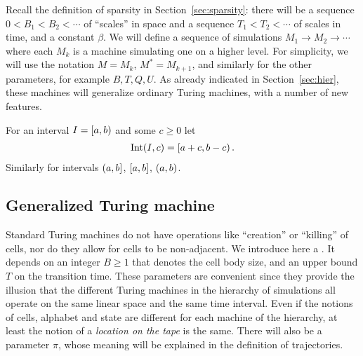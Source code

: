 \documentclass[11pt]{memoir}
\theoremstyle{definition} %
\renewcommand{\ge}{\geq}
\def\B{B}
\def\U{U}
\newcommand{\Int}{\mathrm{Int}}
\newcommand{\passno}{\pi}
\newcommand{\Q}{Q}
\newcommand{\Tu}{T}
\begin{document}
Recall the definition of sparsity in Section~\ref{sec:sparsity}: there will be 
a sequence \( 0<\B_{1}<\B_{2}<\dotsm \) of ``scales'' in space and a sequence
\( \Tu_{1}<\Tu_{2}<\dotsm \) of scales in time, and a constant \( \beta \).
We will define a sequence of simulations \( M_{1}\to M_{2}\to\dotsm \) where
each \( M_{k} \) is a machine simulating one on a higher level.
For simplicity, we will use the notation \( M=M_{k} \), \( M^{*}=M_{k+1} \),
and similarly for the other parameters, for example \( \B,\Tu, \Q, \U \).
As already indicated in Section~\ref{sec:hier}, these machines will generalize
ordinary Turing machines, with a number of new features.

\begin{notation}
  For an interval \( I=\left[a,b\right) \) and some \( c\ge 0 \) let
  \begin{align*}
   \Int(I,c) = \lint{a+c}{b-c}.
  \end{align*}
  Similarly for intervals \( (a,b] \), \( [a,b] \), \( (a,b) \).
\end{notation}

\subsection{Generalized Turing machine}\label{sec:gen-TM}

Standard Turing machines do not have
operations like ``creation'' or ``killing'' of cells, nor
do they allow for cells to be non-adjacent.
We introduce here a .
It depends on an integer \( \B \ge 1 \) that denotes the cell body size,
and an upper bound \( \Tu \) on the transition time.
These parameters are convenient since they provide the illusion that the different Turing
machines in the hierarchy of simulations all operate on the same linear space and the same time
interval.
Even if the notions of cells, alphabet and state are different for each machine of the hierarchy, 
at least the notion of a \emph{location on the tape} is the same.
There will also be a  parameter \( \passno \),
whose meaning will be explained in the definition of trajectories.
\end{document}

